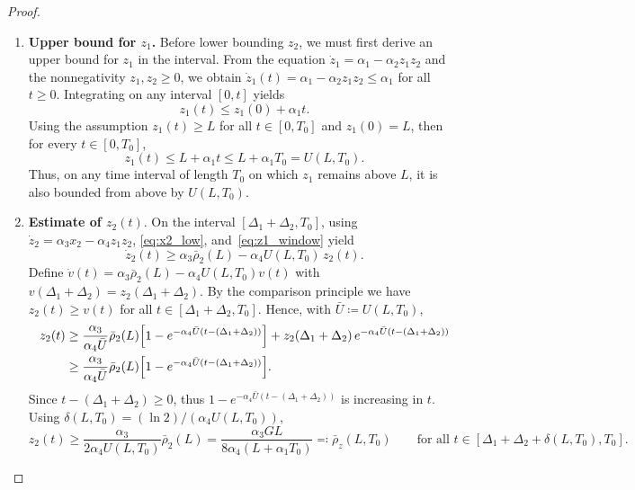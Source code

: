 \documentclass{article}
\begin{document}
\begin{proof}
\begin{enumerate}[leftmargin=*]
    \item \textbf{Upper bound for $z_1$.}
    Before lower bounding $z_2$, we must first derive an upper bound for 
    $z_1$ in the interval. From the equation $\dot z_1=\alpha_1-\alpha_2 
    z_1 z_2$ and the nonnegativity $z_1,z_2\ge 0$, we obtain
    $\dot z_1(t)=\alpha_1-\alpha_2 z_1 z_2\le\alpha_1$ for all $t\ge 0.$
    Integrating on any interval $[0,t]$ yields
    \begin{equation*}
        z_1(t) \le z_1(0) + \alpha_1 t.
    \end{equation*}
    Using the assumption $z_1(t)\ge L$ for all $t\in[0,T_0]$ and 
    $z_1(0)=L$, then for every $t\in[0,T_0]$,
    \begin{equation}\label{eq:z1_window}
        z_1(t)\le L+\alpha_1 t
        \le L+\alpha_1T_0 = U(L,T_0).
    \end{equation}
    Thus, on any time interval of length $T_0$ on which $z_1$ remains 
    above $L$, it is also bounded from above by $U(L,T_0)$.

    \item \textbf{Estimate of $z_2(t)$}. On the interval 
    $[\Delta_1+\Delta_2,T_0]$, using $\dot z_2=\alpha_3 x_2-\alpha_4 
    z_1 z_2$, \eqref{eq:x2_low}, and~\eqref{eq:z1_window} yield
    \begin{equation*}
        \dot z_2(t) \ge \alpha_3\bar\rho_2(L) - \alpha_4 U(L,T_0)\,z_2(t).
    \end{equation*}
    Define $\dot v(t)=\alpha_3\bar\rho_2(L)-\alpha_4 U(L,T_0)v(t)$ with 
    $v(\Delta_1+\Delta_2)=z_2(\Delta_1+\Delta_2)$.
    By the comparison principle we have $z_2(t)\ge v(t)$ for all
    $t\in[\Delta_1+\Delta_2,T_0]$. Hence, with $\bar U\coloneqq U(L,T_0)$,
    \begin{equation*}
        \begin{aligned}
            z_2(t) &\ge \frac{\alpha_3}{\alpha_4\bar U}\bar\rho_2(L) 
            \Bigl[1-e^{-\alpha_4\bar U(t-(\Delta_1+\Delta_2))}\Bigr]
            + z_2(\Delta_1+\Delta_2)\,e^{-\alpha_4\bar U(t-(\Delta_1+\Delta_2))} \\
            &\ge \frac{\alpha_3}{\alpha_4\bar U}\bar\rho_2(L) 
            \Bigl[1-e^{-\alpha_4\bar U(t-(\Delta_1+\Delta_2))}\Bigr].
        \end{aligned}
    \end{equation*}
    Since $t-(\Delta_1+\Delta_2)\ge 0$, thus $1-e^{-\alpha_4\bar U(t-(\Delta_1+\Delta_2))}$ is increasing in $t$. Using $\delta(L,T_0)=(\ln 2)/(\alpha_4 U(L,T_0))$,
    \begin{equation}\label{eq:z2_low_4d}
        z_2(t) \ge \frac{\alpha_3}{2\alpha_4 U(L,T_0)}\bar\rho_2(L) 
        = \frac{\alpha_3 GL}{8\alpha_4(L+\alpha_1 T_0)} 
        \eqqcolon \bar\rho_z(L,T_0)
        \qquad\text{for all } t\in[\Delta_1+\Delta_2+\delta(L,T_0),T_0].
    \end{equation}
\end{enumerate}


\end{proof}
\end{document}
